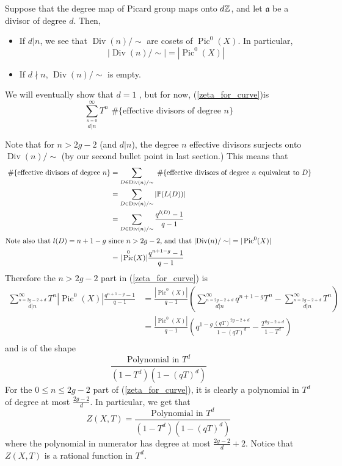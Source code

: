 \documentclass[letterpaper,11pt]{article}
\DeclareMathOperator{\Div}{Div}
\DeclareMathOperator{\Pic}{Pic}
\begin{document}
Suppose that the degree map of Picard group maps onto $d\mathbb{Z}$, and let $\mathfrak{a}$ be a divisor of degree $d$. Then,
\begin{itemize}
    \item If $d|n$, we see that $\Div(n)/\sim$ are cosets of $\Pic^0(X)$. In particular,
    \[
    |\Div(n)/\sim| = |\Pic^0(X)|
    \]
    \item If $d\nmid n$, $\Div(n)/\sim$ is empty.
\end{itemize}
We will eventually show that $d = 1$ , but for now, (\ref{zeta_for_curve})is
\[
\sum_{\stackrel{n=0}{d|n}}^{\infty} T^n \text{ \#\{effective divisors of degree $n$\}}
\]

Note that for $n > 2g-2$ (and $d|n$), the degree $n$ effective divisors surjects onto $\Div(n)/\sim$ (by our second bullet point in last section.) This means that 
\begin{align*}
    \text{ \#\{effective divisors of degree $n$\}} &= \sum_{D \in \Div(n)/\sim} \text{ \#\{effective divisors of degree $n$ equivalent to $D$\}} \\
    &= \sum_{D \in \Div(n)/\sim} |\PP(L(D))| \\
    &= \sum_{D \in \Div(n)/\sim} \frac{q^{l(D)}-1}{q-1} \\
\intertext{Note also that $l(D) = n + 1 - g$ since $n > 2g-2$, and that $\left|\Div(n)/\sim\right| = |\Pic^0(X)|$}
    &= |\Pic^0(X)| \frac{q^{n+1 - g}-1}{q-1}
\end{align*}
Therefore the $n > 2g-2$ part in (\ref{zeta_for_curve}) is
\begin{align*}
    \sum_{\stackrel{n = 2g-2+d}{d|n}}^{\infty} T^n |\Pic^0(X)| \frac{q^{n+1 - g}-1}{q-1} &= \frac{|\Pic^0(X)|}{q-1} \left(\sum_{\stackrel{n = 2g-2+d}{d|n}}^{\infty} q^{n+1-g}T^n - \sum_{\stackrel{n = 2g-2+d}{d|n}}^{\infty} T^n\right)  \\
    &= \frac{|\Pic^0(X)|}{q-1} \left(q^{1-g} \frac{(qT)^{2g-2+d}}{1-(qT)^d} - \frac{T^{2g-2+d}}{1-T^d}\right) \\
\end{align*}
and is of the shape
\[
\frac{\text{Polynomial in $T^d$}}{(1-T^d)(1-(qT)^d)}
\]
For the $0 \leq n \leq 2g-2$ part of (\ref{zeta_for_curve}), it is clearly a polynomial in $T^d$ of degree at most $\frac{2g-2}{d}$. In particular, we get that 
\[
Z(X,T) = \frac{\text{Polynomial in $T^d$}}{(1-T^d)(1-(qT)^d)}
\]
where the polynomial in numerator has degree at most $\frac{2g-2}{d} + 2$. Notice that $Z(X,T)$ is a rational function in $T^d$.
\end{document}
